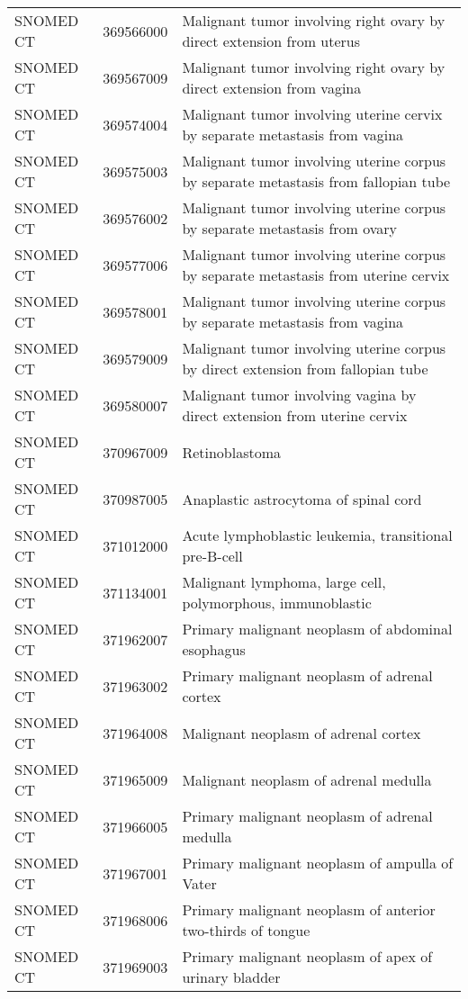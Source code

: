 \begin{longtable}{p{}p{}p{}}
  SNOMED CT & 369566000 & Malignant tumor involving right ovary by direct extension from uterus \\ 
  SNOMED CT & 369567009 & Malignant tumor involving right ovary by direct extension from vagina \\ 
  SNOMED CT & 369574004 & Malignant tumor involving uterine cervix by separate metastasis from vagina \\ 
  SNOMED CT & 369575003 & Malignant tumor involving uterine corpus by separate metastasis from fallopian tube \\ 
  SNOMED CT & 369576002 & Malignant tumor involving uterine corpus by separate metastasis from ovary \\ 
  SNOMED CT & 369577006 & Malignant tumor involving uterine corpus by separate metastasis from uterine cervix \\ 
  SNOMED CT & 369578001 & Malignant tumor involving uterine corpus by separate metastasis from vagina \\ 
  SNOMED CT & 369579009 & Malignant tumor involving uterine corpus by direct extension from fallopian tube \\ 
  SNOMED CT & 369580007 & Malignant tumor involving vagina by direct extension from uterine cervix \\ 
  SNOMED CT & 370967009 & Retinoblastoma \\ 
  SNOMED CT & 370987005 & Anaplastic astrocytoma of spinal cord \\ 
  SNOMED CT & 371012000 & Acute lymphoblastic leukemia, transitional pre-B-cell \\ 
  SNOMED CT & 371134001 & Malignant lymphoma, large cell, polymorphous, immunoblastic \\ 
  SNOMED CT & 371962007 & Primary malignant neoplasm of abdominal esophagus \\ 
  SNOMED CT & 371963002 & Primary malignant neoplasm of adrenal cortex \\ 
  SNOMED CT & 371964008 & Malignant neoplasm of adrenal cortex \\ 
  SNOMED CT & 371965009 & Malignant neoplasm of adrenal medulla \\ 
  SNOMED CT & 371966005 & Primary malignant neoplasm of adrenal medulla \\ 
  SNOMED CT & 371967001 & Primary malignant neoplasm of ampulla of Vater \\ 
  SNOMED CT & 371968006 & Primary malignant neoplasm of anterior two-thirds of tongue \\ 
  SNOMED CT & 371969003 & Primary malignant neoplasm of apex of urinary bladder \\ 

\end{longtable}
